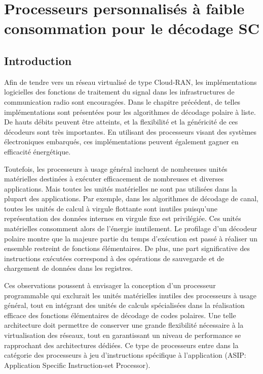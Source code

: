 \chapter{Processeurs personnalisés à faible consommation pour le décodage SC} %
\label{chap:tensilica}

\vspace*{\fill}
\minitocTITI
\vspace*{\fill}
\newpage

\section*{Introduction}
Afin de tendre vers un réseau virtualisé de type Cloud-RAN, les implémentations logicielles des fonctions de traitement du signal dans les infrastructures de communication radio sont encouragées. Dans le chapitre précédent, de telles implémentations sont présentées pour les algorithmes de décodage polaire à liste. De hauts débits peuvent être atteints, et la flexibilité et la généricité de ces décodeurs sont très importantes. En utilisant des processeurs visant des systèmes électroniques embarqués, ces implémentations peuvent également gagner en efficacité énergétique.

Toutefois, les processeurs à usage général incluent de nombreuses unités matérielles destinées à exécuter efficacement de nombreuses et diverses applications. Mais toutes les unités matérielles ne sont pas utilisées dans la plupart des applications. Par exemple, dans les algorithmes de décodage de canal, toutes les unités de calcul à virgule flottante sont inutiles puisqu'une représentation des données internes en virgule fixe est privilégiée. Ces unités matérielles consomment alors de l'énergie inutilement. Le profilage d'un décodeur polaire montre que la majeure partie du temps d'exécution est passé à réaliser un ensemble restreint de fonctions élémentaires. De plus, une part significative des instructions exécutées correspond à des opérations de sauvegarde et de chargement de données dans les registres.

Ces observations poussent à envisager la conception d'un processeur programmable qui exclurait les unités matérielles inutiles des processeurs à usage général, tout en intégrant des unités de calculs spécialisées dans la réalisation efficace des fonctions élémentaires de décodage de codes polaires. Une telle architecture doit permettre de conserver une grande flexibilité nécessaire à la virtualisation des réseaux, tout en garantissant un niveau de performance se rapprochant des architectures dédiées. Ce type de processeurs entre dans la catégorie des processeurs à jeu d'instructions spécifique à l'application (ASIP: Application Specific Instruction-set Processor).

